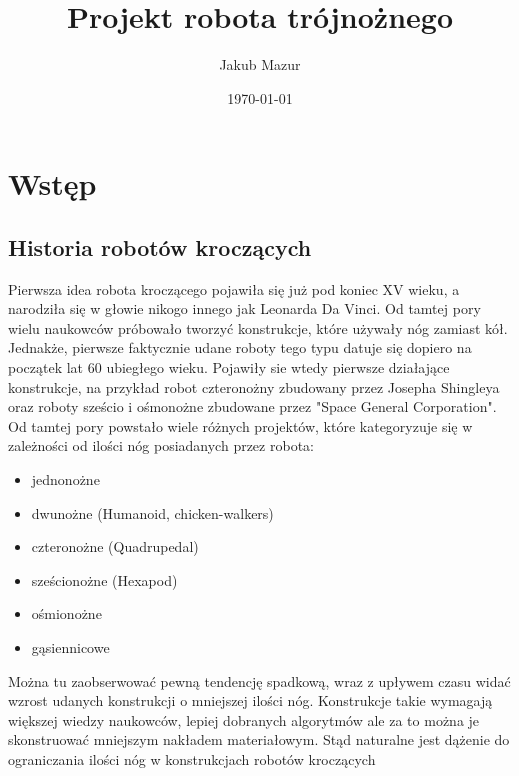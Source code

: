 \documentclass[a4paper,13pt]{article}
\title{Projekt robota trójnożnego}
\author{Jakub Mazur}
\date{\today}
\begin{document}


\maketitle

\hypersetup{
	linktocpage=true,
    colorlinks=true,
    urlcolor=red,
    linktoc=all,
    linkcolor=blue,
}
\tableofcontents

\section{Wstęp}
\subsection{Historia robotów kroczących}
Pierwsza idea robota kroczącego pojawiła się już pod koniec XV wieku, a narodziła się w głowie nikogo innego jak Leonarda Da Vinci. Od tamtej pory wielu naukowców próbowało tworzyć konstrukcje, które używały nóg zamiast kół. Jednakże, pierwsze faktycznie udane roboty tego typu datuje się dopiero na początek lat 60 ubiegłego wieku. Pojawiły sie wtedy pierwsze działające konstrukcje, na przykład robot czteronożny zbudowany przez Josepha Shingleya oraz roboty sześcio i ośmonożne zbudowane przez "Space General Corporation". \cite{history}\\

Od tamtej pory powstało wiele różnych projektów, które kategoryzuje się w zależności od ilości nóg posiadanych przez robota:\\
\begin{itemize}
	\item jednonożne
	\item dwunożne (Humanoid, chicken-walkers)
	\item czteronożne (Quadrupedal)
	\item sześcionożne (Hexapod)
	\item ośmionożne
	\item gąsiennicowe
\end{itemize}

Można tu zaobserwować pewną tendencję spadkową, wraz z upływem czasu widać wzrost udanych konstrukcji o mniejszej ilości nóg. Konstrukcje takie wymagają większej wiedzy naukowców, lepiej dobranych algorytmów ale za to można je skonstruować mniejszym nakładem materiałowym. Stąd naturalne jest dążenie do ograniczania ilości nóg w konstrukcjach robotów kroczących\\
\end{document}
